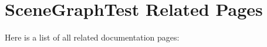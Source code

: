\section{SceneGraphTest Related Pages}
Here is a list of all related documentation pages:\begin{CompactList}
\item {}

\end{CompactList}
